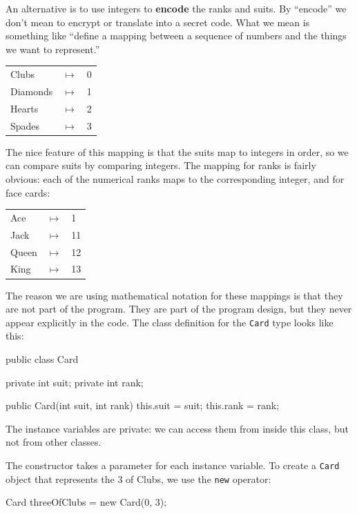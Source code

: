 \documentclass[12pt]{book}
\theoremstyle{exercise}
\newcommand{\java}[1]{\verb"#1"}
\newcommand{\java}[1]{\lstinline{#1}} %
\begin{document}

An alternative is to use integers to {\bf encode} the ranks and suits.
By ``encode'' we don't mean to encrypt or translate into a secret code.
What we mean is something like ``define a mapping between a sequence of numbers and the things we want to represent.''

\begin{tabular}{l c l}
Clubs & $\mapsto$ & 0 \\
Diamonds & $\mapsto$ & 1 \\
Hearts & $\mapsto$ & 2 \\
Spades & $\mapsto$ & 3
\end{tabular}

The nice feature of this mapping is that the suits map to integers in order, so we can compare suits by comparing integers.
The mapping for ranks is fairly obvious: each of the numerical ranks maps to the corresponding integer, and for face cards:

\begin{tabular}{l c l}
Ace & $\mapsto$ & 1 \\
Jack & $\mapsto$ & 11 \\
Queen & $\mapsto$ & 12 \\
King & $\mapsto$ & 13 \\
\end{tabular}

The reason we are using mathematical notation for these mappings is that they are not part of the program.
They are part of the program design, but they never appear explicitly in the code.
The class definition for the \java{Card} type looks like this:

\begin{code}
public class Card {
    private int suit;
    private int rank;

    public Card(int suit, int rank) {
        this.suit = suit;
        this.rank = rank;
    }
}
\end{code}


The instance variables are private: we can access them from inside this class, but not from other classes.

The constructor takes a parameter for each instance variable.
To create a \java{Card} object that represents the 3 of Clubs, we use the \java{new} operator:

\begin{code}
    Card threeOfClubs = new Card(0, 3);
\end{code}
\end{document}
